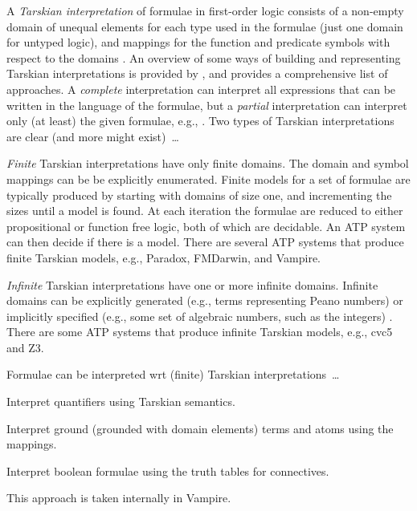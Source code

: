 \documentclass{easychair}
\newenvironment{packed_itemize}{
\vspace*{-0.3em}
\begin{itemize}
\setlength{\partopsep}{0pt}
\setlength{\itemsep}{1pt}
\setlength{\parskip}{0pt}
\setlength{\parsep}{0pt}
}{\end{itemize}}
\begin{document}
A {\em Tarskian interpretation} \cite{TV56} of formulae in first-order logic consists of a 
non-empty domain of unequal elements for each type used in the formulae (just one domain for 
untyped logic), and mappings for the function and predicate symbols with respect to the 
domains \cite{Hun96,Gal15}.
An overview of some ways of building and representing Tarskian interpretations is provided 
by \cite{CLP04}, and \cite{Pel03-EQMC} provides a comprehensive list of approaches.
A {\em complete} interpretation can interpret all expressions that can be written in the language 
of the formulae, but a {\em partial} interpretation can interpret only (at least) the 
given formulae, e.g., \cite{BSW23}.
Two types of Tarskian interpretations are clear (and more might exist)~\ldots
\begin{packed_itemize}
\item {\em Finite} Tarskian interpretations have only finite domains.
      The domain and symbol mappings can be be explicitly enumerated.
      Finite models for a set of formulae are typically produced by starting with domains of 
      size one, and incrementing the sizes until a model is found.
      At each iteration the formulae are reduced to either propositional 
      \cite{CS03,McC03-MACE4-TR} or function free \cite{BF+09} logic, both of which are decidable.
      An ATP system can then decide if there is a model.
      There are several ATP systems that produce finite Tarskian models, e.g., Paradox, FMDarwin, 
      and Vampire.
\item {\em Infinite} Tarskian interpretations have one or more infinite domains.
      Infinite domains can be explicitly generated (e.g., terms representing Peano numbers) or 
      implicitly specified (e.g., some set of algebraic numbers, such as the integers) \cite{BB13}.
      There are some ATP systems that produce infinite Tarskian models, e.g., 
      cvc5 \cite{BB+22-cvc5} and Z3.
\end{packed_itemize}
\vspace*{-0.5em}
Formulae can be interpreted wrt (finite) Tarskian interpretations~\ldots
\begin{packed_itemize}
\item Interpret quantifiers using Tarskian semantics.
\item Interpret ground (grounded with domain elements) terms and atoms using the mappings.
\item Interpret boolean formulae using the truth tables for connectives.
\end{packed_itemize}
\vspace*{-0.5em}
This approach is taken internally in Vampire.
\end{document}
